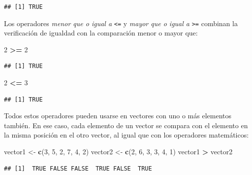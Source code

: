 \documentclass[
]{book}
\newenvironment{Shaded}{\begin{snugshade}}{\end{snugshade}}
\newcommand{\DecValTok}[1]{\textcolor[rgb]{0.00,0.00,0.81}{#1}}
\newcommand{\KeywordTok}[1]{\textcolor[rgb]{0.13,0.29,0.53}{\textbf{#1}}}
\newcommand{\NormalTok}[1]{#1}
\newcommand{\OperatorTok}[1]{\textcolor[rgb]{0.81,0.36,0.00}{\textbf{#1}}}
\newcommand{\StringTok}[1]{\textcolor[rgb]{0.31,0.60,0.02}{#1}}
\begin{document}
\begin{verbatim}
## [1] TRUE
\end{verbatim}

Los operadores \emph{menor que o igual a} \texttt{\textless{}=} y \emph{mayor que o igual a} \texttt{\textgreater{}=} combinan la verificación de igualdad con la comparación menor o mayor que:

\begin{Shaded}
\begin{Highlighting}[]
\DecValTok{2} \OperatorTok{>=}\StringTok{ }\DecValTok{2}
\end{Highlighting}
\end{Shaded}

\begin{verbatim}
## [1] TRUE
\end{verbatim}

\begin{Shaded}
\begin{Highlighting}[]
\DecValTok{2} \OperatorTok{<=}\StringTok{ }\DecValTok{3}
\end{Highlighting}
\end{Shaded}

\begin{verbatim}
## [1] TRUE
\end{verbatim}

Todos estos operadores pueden usarse en vectores con uno o más elementos también. En ese caso, cada elemento de un vector se compara con el elemento en la misma posición en el otro vector, al igual que con los operadores matemáticos:

\begin{Shaded}
\begin{Highlighting}[]
\NormalTok{vector1 <-}\StringTok{ }\KeywordTok{c}\NormalTok{(}\DecValTok{3}\NormalTok{, }\DecValTok{5}\NormalTok{, }\DecValTok{2}\NormalTok{, }\DecValTok{7}\NormalTok{, }\DecValTok{4}\NormalTok{, }\DecValTok{2}\NormalTok{)}
\NormalTok{vector2 <-}\StringTok{ }\KeywordTok{c}\NormalTok{(}\DecValTok{2}\NormalTok{, }\DecValTok{6}\NormalTok{, }\DecValTok{3}\NormalTok{, }\DecValTok{3}\NormalTok{, }\DecValTok{4}\NormalTok{, }\DecValTok{1}\NormalTok{)}
\NormalTok{vector1 }\OperatorTok{>}\StringTok{ }\NormalTok{vector2}
\end{Highlighting}
\end{Shaded}

\begin{verbatim}
## [1]  TRUE FALSE FALSE  TRUE FALSE  TRUE
\end{verbatim}
\end{document}
